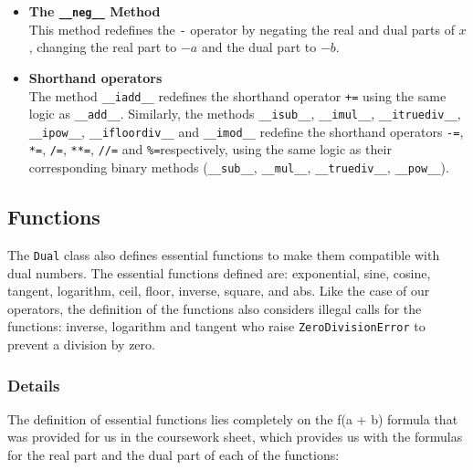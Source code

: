 \documentclass[a4paper,12pt]{article}
\begin{document}
\begin{itemize}


    \item \textbf{The \texttt{\_\_neg\_\_} Method} \\
    This method redefines the \texttt{-} operator by negating the real and dual parts of \(x\), changing the real part to \(-a\) and the dual part to \(-b\).
  \item \textbf{Shorthand operators} \\
The method \texttt{\_\_iadd\_\_} redefines the shorthand operator \texttt{+=} using the same logic as \texttt{\_\_add\_\_}.
Similarly, the methods \texttt{\_\_isub\_\_}, \texttt{\_\_imul\_\_}, \texttt{\_\_itruediv\_\_}, \texttt{\_\_ipow\_\_}, \texttt{\_\_ifloordiv\_\_} and \texttt{\_\_imod\_\_} redefine the shorthand operators \texttt{-=}, \texttt{*=}, \texttt{/=}, \texttt{**=}, \texttt{//=} and \texttt{\%=}respectively, using the same logic as their corresponding binary methods (\texttt{\_\_sub\_\_}, \texttt{\_\_mul\_\_}, \texttt{\_\_truediv\_\_}, \texttt{\_\_pow\_\_}).
\end{itemize}

\subsection{Functions}
The \texttt{Dual} class also defines essential functions to make them compatible with dual numbers. The essential functions defined are: exponential, sine, cosine, tangent, logarithm, ceil, floor, inverse, square, and abs.
Like the case of our operators, the definition of the functions also considers illegal calls for the functions: inverse, logarithm and tangent who raise \texttt{ZeroDivisionError}  to prevent a division by zero.

\subsubsection{Details}
The definition of essential functions lies completely on the f(a + b\epsilon\)) formula that was provided for us in the coursework sheet, which provides us with the formulas for the real part and the dual part of each of the functions:
\end{document}
